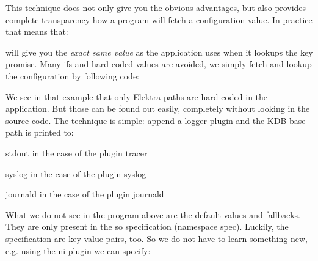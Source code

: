 This technique does not only give you the obvious advantages, but also provides complete transparency how a program will fetch a configuration value. In practice that means that\+:




will give you the {\itshape exact same value} as the application uses when it lookups the key {\ttfamily promise}. Many {\ttfamily if}s and hard coded values are avoided, we simply fetch and lookup the configuration by following code\+:




We see in that example that only Elektra paths are hard coded in the application. But those can be found out easily, completely without looking in the source code. The technique is simple\+: append a logger plugin and the K\+DB base path is printed to\+:


\begin{DoxyItemize}
\item stdout in the case of the plugin tracer
\item syslog in the case of the plugin syslog
\item journald in the case of the plugin journald
\end{DoxyItemize}

What we do not see in the program above are the default values and fallbacks. They are only present in the so specification (namespace {\ttfamily spec}). Luckily, the specification are key-\/value pairs, too. So we do not have to learn something new, e.\+g. using the ni plugin we can specify\+:





